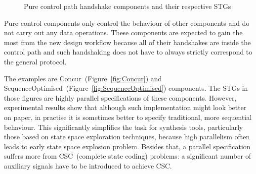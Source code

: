 \begin{figure}
\centering
{}


\caption{Pure control path handshake components and their respective STGs}
\end{figure}


Pure control components only control the behaviour of other components
and do not carry out any data operations. These components are expected
to gain the most from the new design workflow because all of their
handshakes are inside the control path and such handshaking does not
have to always strictly correspond to the general protocol.

The examples are Concur~(Figure~\ref{fig:Concur}) and SequenceOptimised~(Figure~\ref{fig:SequenceOptimised})
components. The STGs in those figures are highly parallel specifications
of these components. However, experimental results show that although
such implementation might look better on paper, in practise it is
sometimes better to specify traditional, more sequential behaviour.
This significantly simplifies the task for synthesis tools, particularly
those based on state space exploration techniques, because high parallelism
often leads to early state space explosion problem. Besides that,
a parallel specification suffers more from CSC~(complete state coding)
problems: a significant number of auxiliary signals have to be introduced
to achieve CSC.


